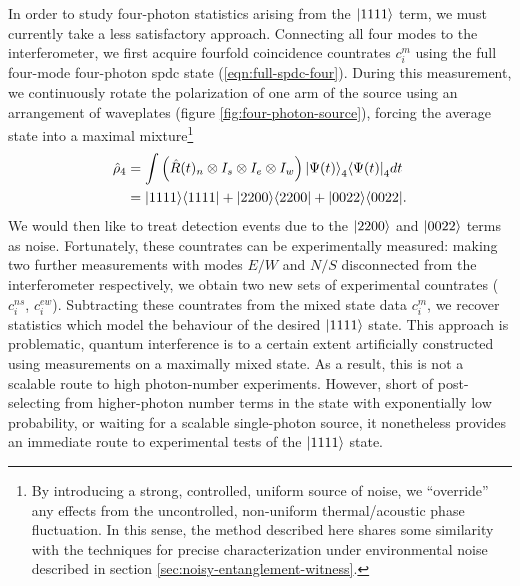 In order to study four-photon statistics arising from the $\mbox{$ | 1111 \rangle $}$ term, we must currently take a less satisfactory approach. Connecting all four modes to the interferometer, we first acquire fourfold coincidence countrates $c_i^m$ using the full four-mode four-photon \gls{spdc} state (\ref{eqn:full-spdc-four}). During this measurement, we continuously rotate the polarization of one arm of the source using an arrangement of waveplates (figure \ref{fig:four-photon-source}), forcing the average state into a maximal mixture\footnote{By introducing a strong, controlled, uniform source of noise, we ``override'' any effects from the uncontrolled, non-uniform thermal/acoustic phase fluctuation. In this sense, the method described here shares some similarity with the techniques for precise characterization under environmental noise described in section \ref{sec:noisy-entanglement-witness}.}
\begin{align}
\hat{\rho}_4 
&= \int  \left(\hat{R}(t)_n \otimes I_s \otimes I_e \otimes I_w \right) \mbox{$ | \Psi (t) \rangle $}_4 
\mbox{$ \langle \Psi (t) | $}_4 dt \notag\\
&= \mbox{$ | 1111 \rangle $}\mbox{$ \langle 1111 | $} + \mbox{$ | 2200 \rangle $}\mbox{$ \langle 2200 | $} +\mbox{$ | 0022 \rangle $}\mbox{$ \langle 0022 | $}.
\label{eqn:spdc-mixed-state}
\end{align}
We would then like to treat detection events due to the $\mbox{$ | 2200 \rangle $}$ and $\mbox{$ | 0022 \rangle $}$ terms as noise. Fortunately, these countrates can be experimentally measured: making two further measurements with modes $E/W$ and $N/S$ disconnected from the interferometer respectively, we obtain two new sets of experimental countrates ($c_i^{ns}$, $c_i^{ew}$). Subtracting these countrates from the mixed state data $c_i^m$, we recover statistics which model the behaviour of the desired $\mbox{$ | 1111 \rangle $}$ state. This approach is problematic, quantum interference is to a certain extent artificially constructed using measurements on a maximally mixed state. As a result, this is not a scalable route to high photon-number experiments. However, short of post-selecting from higher-photon number terms in the state with exponentially low probability, or waiting for a scalable single-photon source, it nonetheless provides an immediate route to experimental tests of the $\mbox{$ | 1111 \rangle $}$ state.

\newcommand{\sion}{SiO$_x$N$_y$\xspace}
